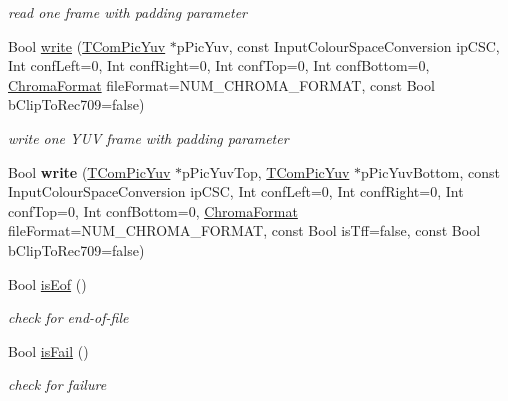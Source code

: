 \begin{DoxyCompactItemize}
\begin{DoxyCompactList}\small\item\em read one frame with padding parameter \end{DoxyCompactList}\item 
Bool \hyperlink{class_t_video_i_o_yuv_a1e0ade1f702a1d24a8290bb61de71b05}{write} (\hyperlink{class_t_com_pic_yuv}{T\+Com\+Pic\+Yuv} $\ast$p\+Pic\+Yuv, const Input\+Colour\+Space\+Conversion ip\+C\+SC, Int conf\+Left=0, Int conf\+Right=0, Int conf\+Top=0, Int conf\+Bottom=0, \hyperlink{_type_def_8h_a4a6c51c10f2eb04abc7209db7caff39f}{Chroma\+Format} file\+Format=N\+U\+M\+\_\+\+C\+H\+R\+O\+M\+A\+\_\+\+F\+O\+R\+M\+AT, const Bool b\+Clip\+To\+Rec709=false)
\begin{DoxyCompactList}\small\item\em write one Y\+UV frame with padding parameter \end{DoxyCompactList}\item 
\mbox{\label{class_t_video_i_o_yuv_ab721f67c64c9cba1b288a581ea5f7c2f}} 
Bool {\bfseries write} (\hyperlink{class_t_com_pic_yuv}{T\+Com\+Pic\+Yuv} $\ast$p\+Pic\+Yuv\+Top, \hyperlink{class_t_com_pic_yuv}{T\+Com\+Pic\+Yuv} $\ast$p\+Pic\+Yuv\+Bottom, const Input\+Colour\+Space\+Conversion ip\+C\+SC, Int conf\+Left=0, Int conf\+Right=0, Int conf\+Top=0, Int conf\+Bottom=0, \hyperlink{_type_def_8h_a4a6c51c10f2eb04abc7209db7caff39f}{Chroma\+Format} file\+Format=N\+U\+M\+\_\+\+C\+H\+R\+O\+M\+A\+\_\+\+F\+O\+R\+M\+AT, const Bool is\+Tff=false, const Bool b\+Clip\+To\+Rec709=false)
\item 
\mbox{\label{class_t_video_i_o_yuv_a1d6c64567822c98aafe6e719b6b1f0db}} 
Bool \hyperlink{class_t_video_i_o_yuv_a1d6c64567822c98aafe6e719b6b1f0db}{is\+Eof} ()
\begin{DoxyCompactList}\small\item\em check for end-\/of-\/file \end{DoxyCompactList}\item 
\mbox{\label{class_t_video_i_o_yuv_a61605b9f6f2ba3105d7cb25ad4bab695}} 
Bool \hyperlink{class_t_video_i_o_yuv_a61605b9f6f2ba3105d7cb25ad4bab695}{is\+Fail} ()
\begin{DoxyCompactList}\small\item\em check for failure \end{DoxyCompactList}\end{DoxyCompactItemize}
